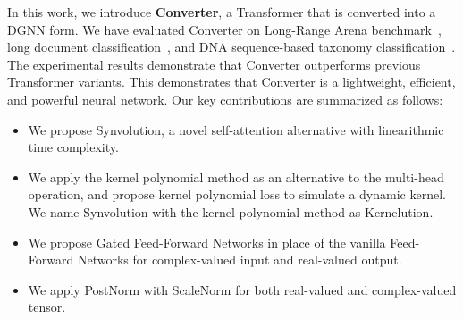In this work, we introduce \textbf{Converter}, a Transformer that is converted into a DGNN form. We have evaluated Converter on Long-Range Arena benchmark~\citep{tay2021long}, long document classification~\citep{9878955}, and DNA sequence-based taxonomy classification~\citep{9878955}. The experimental results demonstrate that Converter outperforms previous Transformer variants. This demonstrates that Converter is a lightweight, efficient, and powerful neural network. Our key contributions are summarized as follows:
\begin{itemize}
\item We propose Synvolution, a novel self-attention alternative with linearithmic time complexity.
\item We apply the kernel polynomial method as an alternative to the multi-head operation, and propose kernel polynomial loss to simulate a dynamic kernel. We name Synvolution with the kernel polynomial method as Kernelution.
\item We propose Gated Feed-Forward Networks in place of the vanilla Feed-Forward Networks for complex-valued input and real-valued output.
\item We apply PostNorm with ScaleNorm for both real-valued and complex-valued tensor.
\end{itemize}